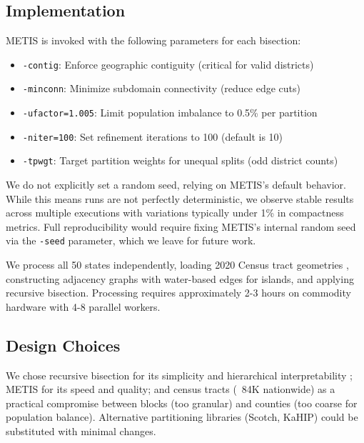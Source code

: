 \subsection{Implementation}

METIS is invoked with the following parameters for each bisection:
\begin{itemize}
    \item \texttt{-contig}: Enforce geographic contiguity (critical for valid districts)
    \item \texttt{-minconn}: Minimize subdomain connectivity (reduce edge cuts)
    \item \texttt{-ufactor=1.005}: Limit population imbalance to 0.5\% per partition
    \item \texttt{-niter=100}: Set refinement iterations to 100 (default is 10)
    \item \texttt{-tpwgt}: Target partition weights for unequal splits (odd district counts)
\end{itemize}

We do not explicitly set a random seed, relying on METIS's default behavior. While this means runs are not perfectly deterministic, we observe stable results across multiple executions with variations typically under 1\% in compactness metrics. Full reproducibility would require fixing METIS's internal random seed via the \texttt{-seed} parameter, which we leave for future work.

We process all 50 states independently, loading 2020 Census tract geometries \cite{census2020redistricting}, constructing adjacency graphs with water-based edges for islands, and applying recursive bisection. Processing requires approximately 2-3 hours on commodity hardware with 4-8 parallel workers.

\subsection{Design Choices}

We chose recursive bisection for its simplicity and hierarchical interpretability \cite{hess1965nonpartisan}; METIS for its speed and quality; and census tracts (~84K nationwide) as a practical compromise between blocks (too granular) and counties (too coarse for population balance). Alternative partitioning libraries (Scotch, KaHIP) could be substituted with minimal changes.
